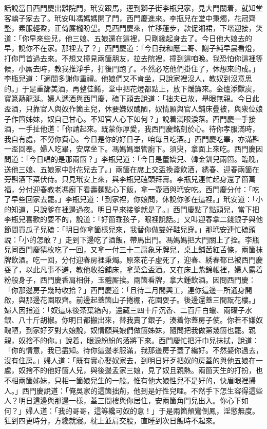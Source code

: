 話說當日西門慶出離院門，玳安跟馬，逕到獅子街李瓶兒家，見大門關着，{}就知堂客轎子家去了。玳安叫馮媽媽開了門，西門慶進來。李瓶兒在堂中秉燭，花冠齊整，素服輕盈，正倚簾櫳盼望。見西門慶來，忙移蓮步，款促湘裙，下堦迎接，笑道：「你早來些兒，他三娘、五娘還在這裡，只剛纔起身去了。今日他大娘去的早，說你不在家。那裡去了？」西門慶道：「今日我和應二哥、謝子純早晨看燈，打你門首過去來。不想又撞見兩箇朋友，拉去院裡，撞到這咱晚。我恐怕你這裡等候，小厮去時，教我推淨手，打後門跑了。不然必吃他們掛住了，休想來的成。」李瓶兒道：「適間多謝你重禮。他娘們又不肯坐，只說家裡沒人，教奴到沒意思的。」于是重篩美酒，再整佳餚，堂中把花燈都點上，放下煖簾來。金爐添獸炭，寶篆爇龍涎。婦人遞酒與西門慶，磕下頭去說道：「拙夫已故，舉眼無親。今日此盃酒，只靠官人與奴作箇主兒，休要嫌奴醜陋，奴情願與官人鋪床疊被，與衆位娘子作箇姊妹，奴自己甘心。{}不知官人心下如何？」說着滿眼淚落。西門慶一手接酒，一手扯他道：「你請起來。既蒙你厚愛，我西門慶銘刻於心。待你孝服滿時，我自有處，不勞你費心。今日是你的好日子，咱每且吃酒。」西門慶吃畢，亦滿斟一盃回奉。婦人吃畢，安席坐下。馮媽媽單管廚下。須臾，拿面上來吃。西門慶因問道：「今日唱的是那兩箇？」李瓶兒道：「今日是董嬌兒、韓金釧兒兩箇。臨晚，送他三娘、五娘家中討花兒去了。」兩箇在席上交盃換盞飲酒，綉春、迎春兩箇在旁斟酒下菜伏侍。只見玳安上來，與李瓶兒磕頭拜壽。李瓶兒連忙起身還了箇萬福，分付迎春教老馮廚下看壽麵點心下飯，拿一壺酒與玳安吃。西門慶分付：「吃了早些回家去罷。」李瓶兒道：「到家裡，你娘問，休說你爹在這裡。」玳安道：「小的知道，只說爹在裡邊過夜。明日早來接爹就是了。」西門慶點了點頭兒，{}當下把李瓶兒喜歡的要不的，說道：「好箇乖孩子，眼裡說話。」又叫迎春拿二錢銀子與他節間買瓜子兒磕：「明日你拿箇樣兒來，我替你做雙好鞋兒穿。」那玳安連忙磕頭說：「小的怎敢？」走到下邊吃了酒飯，帶馬出門。馮媽媽把大門關上了拴。李瓶兒同西門慶猜枚吃了一回，又拿一付三十二扇象牙牌兒，桌上鋪茜紅苫條，兩箇抹牌飲酒。吃一回，分付迎春房裡秉燭。原來花子虛死了，迎春、綉春都已被西門慶耍了，以此凡事不避，教他收拾鋪床，拿菓盒盃酒。又在床上紫錦帳裡，婦人露着粉般身子，西門慶香肩相併，玉體厮挨。兩箇看牌，拿大鍾飲酒。因問西門慶：「你那邊房子幾時收拾？」西門慶道：「且待二月間興工，連你這邊一所通身開啟，與那邊花園取齊。前邊起蓋箇山子捲棚，花園耍子。後邊還蓋三間翫花樓。」婦人因指道：「奴這床後茶葉箱內，還藏三四十斤沉香、二百斤白蠟、兩礶子水銀、八十斤胡椒。你明日都搬出來，替我賣了銀子，湊着你蓋房子使。你若不嫌奴醜陋，到家好歹對大娘說，奴情願與娘們做箇姊妹，隨問把我做第幾箇也罷。親親，奴捨不的你。」{}說着，眼淚紛紛的落將下來。西門慶忙把汗巾兒抹拭，{}說道：「你的情意，我已盡知。待你這邊孝服滿，我那邊房子蓋了纔好。不然娶你過去，沒有住房。」婦人道：「既有實心娶奴家去，到明日好歹把奴的房蓋的與他五娘在一處，奴捨不的他好箇人兒，{}與後邊孟家三娘，見了奴且親熱。兩箇天生的打扮，也不相兩箇姊妹，只相一箇娘兒生的一般。{}惟有他大娘性兒不是好的，快眉眼裡掃人。」西門慶說道：「俺吳家的這箇拙荊，他到是好性兒哩。{}不然手下怎生容得這些人？明日這邊與那邊一樣，蓋三間樓與你居住，安兩箇角門兒出入。你心下如何？」婦人道：「我的哥哥，這等纔可奴的意！」于是兩箇顛鸞倒鳳，淫慾無度。狂到四更時分，方纔就寢。枕上並肩交股，直睡到次日飯時不起來。

